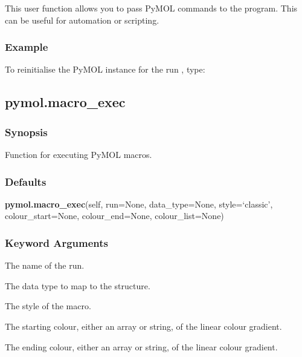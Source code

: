  This user function allows you to pass PyMOL commands to the program.  This can be useful for automation or scripting. 
  

  
 \subsubsection{Example} 

 To reinitialise the PyMOL instance for the run , type: 
  


  

 \newpage 

 \subsection{pymol.macro\_exec} 

  
 \subsubsection{Synopsis} 

 Function for executing PyMOL macros. 
  

  
 \subsubsection{Defaults} 

 \textsf{\textbf{pymol.macro\_exec}(self, run=None, data\_type=None, style=`classic', colour\_start=None, colour\_end=None, colour\_list=None)} 

  
 \subsubsection{Keyword Arguments} 

   The name of the run.   

   The data type to map to the structure.   

   The style of the macro.   

   The starting colour, either an array or string, of the linear colour gradient.   

   The ending colour, either an array or string, of the linear colour gradient.   

